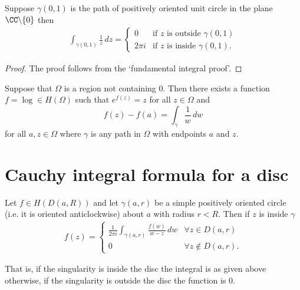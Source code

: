 \documentclass[12pt, a4paper]{article}
\begin{document}
\begin{mdthm}
    Suppose \(\gamma(0,1)\) is the path of positively oriented unit circle in the plane \(\CC \backslash \{0\}\) then 
    \[\begin{aligned}
        \int_{\gamma(0,1)} \frac{1}{z} \, dz = \begin{cases}
        0 &\text{if \(z\) is outside \(\gamma(0,1)\)} \\
        2\pi i &\text{if \(z\) is inside \(\gamma(0,1)\)}.
        \end{cases}
    \end{aligned}\]
\end{mdthm}

\begin{proof}
    The proof follows from the `fundamental integral proof'.
\end{proof}

\begin{corollary}
    Suppose that \(\Omega\) is a region not containing \(0\). Then there exists a function \(f = \log \in H(\Omega)\) such that \(e^{f(z)}=z\) for all \(z \in \Omega\) and 
    \[f(z)- f(a) =\int_{\gamma} \frac{1}{w} \, dw\]
    for all \(a,z \in \Omega\) where \(\gamma\) is any path in \(\Omega\) with endpoints \(a\) and \(z\).
\end{corollary}

\section{Cauchy integral formula for a disc}

\begin{mdthm}
    Let \(f \in H(D(a,R))\) and let \(\gamma(a,r)\) be a simple positively oriented circle (i.e. it is oriented anticlockwise) about \(a\) with radius \(r <R\). Then if \(z\) is inside \(\gamma\)
    \[\begin{aligned}
        f(z) = \begin{cases}
            \frac{1}{2\pi i} \int_{\gamma(a,r)} \frac{f(w)}{w-z} \, dw &\forall z \in D(a,r) \\
            0 &\forall z \not\in D(a,r).
        \end{cases}
    \end{aligned}\]
\end{mdthm}

\begin{mdnote}
    That is, if the singularity is inside the disc the integral is as given above otherwise, if the singularity is outside the disc the function is \(0\).
\end{mdnote}
\end{document}
